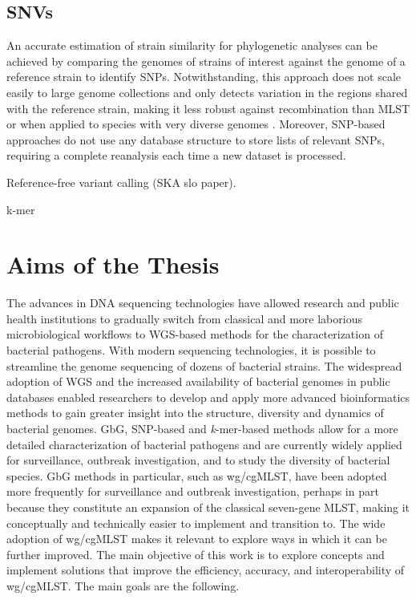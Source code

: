 \subsection{SNVs}

An accurate estimation of strain similarity for phylogenetic analyses can be achieved by comparing the genomes of strains of interest against the genome of a reference strain to identify \ac{SNPs}. Notwithstanding, this approach does not scale easily to large genome collections and only detects variation in the regions shared with the reference strain, making it less robust against recombination than \ac{MLST} or when applied to species with very diverse genomes \cite{jolley_bigsdb_2010}. Moreover, SNP-based approaches do not use any database structure to store lists of relevant SNPs, requiring a complete reanalysis each time a new dataset is processed.

Reference-free variant calling (SKA slo paper).

k-mer

\section{Aims of the Thesis}

The advances in \ac{DNA} sequencing technologies have allowed research and public health institutions to gradually switch from classical and more laborious microbiological workflows to \ac{WGS}-based methods for the characterization of bacterial pathogens. With modern sequencing technologies, it is possible to streamline the genome sequencing of dozens of bacterial strains. The widespread adoption of \ac{WGS} and the increased availability of bacterial genomes in public databases enabled researchers to develop and apply more advanced bioinformatics methods to gain greater insight into the structure, diversity and dynamics of bacterial genomes. \ac{GbG}, \ac{SNP}-based and \textit{k}-mer-based methods allow for a more detailed characterization of bacterial pathogens and are currently widely applied for surveillance, outbreak investigation, and to study the diversity of bacterial species. \ac{GbG} methods in particular, such as \ac{wg/cgMLST}, have been adopted more frequently for surveillance and outbreak investigation, perhaps in part because they constitute an expansion of the classical seven-gene \ac{MLST}, making it conceptually and technically easier to implement and transition to. The wide adoption of \ac{wg/cgMLST} makes it relevant to explore ways in which it can be further improved. The main objective of this work is to explore concepts and implement solutions that improve the efficiency, accuracy, and interoperability of \ac{wg/cgMLST}. The main goals are the following.

